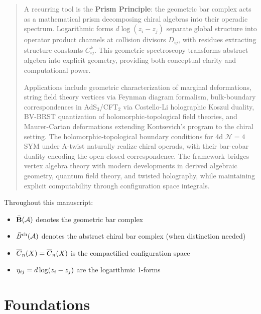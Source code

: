 \documentclass[11pt]{memoir}
\begin{document}
\begin{abstract}
{\medskip
\noindent
A recurring tool is the \textbf{Prism Principle}: the geometric bar complex acts as a mathematical prism decomposing chiral algebras into their operadic spectrum. Logarithmic forms $d\log(z_i - z_j)$ separate global structure into operator product channels at collision divisors $D_{ij}$, with residues extracting structure constants $C_{ij}^k$. This geometric spectroscopy transforms abstract algebra into explicit geometry, providing both conceptual clarity and computational power.

\medskip
\noindent
Applications include geometric characterization of marginal deformations, string 
field theory vertices via Feynman diagram formalism, bulk-boundary correspondences 
in AdS$_3$/CFT$_2$ via Costello-Li holographic Koszul duality, BV-BRST quantization 
of holomorphic-topological field theories, and Maurer-Cartan deformations extending 
Kontsevich's program to the chiral setting. The holomorphic-topological boundary 
conditions for 4d $\mathcal{N}=4$ SYM under A-twist naturally realize chiral 
operads, with their bar-cobar duality encoding the open-closed correspondence. The framework bridges vertex algebra theory with modern developments in derived algebraic geometry, quantum field theory, and twisted holography, while maintaining explicit computability through configuration space integrals.
}
\end{abstract}




\tableofcontents

\medskip
\noindent

\begin{remark}
Throughout this manuscript:
\begin{itemize}
\item $\bar{\mathbf{B}}(\mathcal{A})$ denotes the geometric bar complex
\item $\bar{B}^{\text{ch}}(\mathcal{A})$ denotes the abstract chiral bar complex (when distinction needed)
\item $\overline{C}_{n}(X) = \overline{C}_n(X)$ is the compactified configuration space
\item $\eta_{ij} = d\log(z_i - z_j)$ are the logarithmic 1-forms
\end{itemize}
\end{remark}

\part{Foundations}
\end{document}
